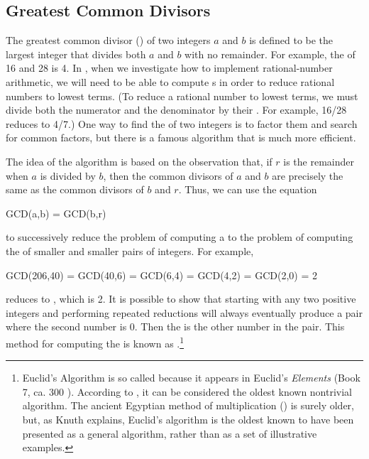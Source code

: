 \subsection{Greatest Common Divisors}
\label{Section 1.2.5}

The greatest common divisor () of two integers \( a \) and \( b \) is
defined to be the largest integer that divides both \( a \) and \( b \) with no
remainder.  For example, the  of 16 and 28 is 4.  In , when we investigate how to implement rational-number arithmetic, we will
need to be able to compute s in order to reduce rational numbers
to lowest terms.  (To reduce a rational number to lowest terms, we must divide
both the numerator and the denominator by their .  For example,
16/28 reduces to 4/7.)  One way to find the  of two integers is to
factor them and search for common factors, but there is a famous algorithm that
is much more efficient.

The idea of the algorithm is based on the observation that, if \( r \) is the
remainder when \( a \) is divided by \( b \), then the common divisors of \( a \) and
\( b \) are precisely the same as the common divisors of \( b \) and \( r \).  Thus,
we can use the equation

\begin{example}
GCD(a,b) = GCD(b,r)
\end{example}

\noindent
to successively reduce the problem of computing a  to the problem
of computing the  of smaller and smaller pairs of integers.  For
example,

\begin{example}
GCD(206,40) = GCD(40,6)
            = GCD(6,4)
            = GCD(4,2)
            = GCD(2,0)
            = 2
\end{example}

\noindent
reduces  to , which is 2.  It is
possible to show that starting with any two positive integers and performing
repeated reductions will always eventually produce a pair where the second
number is 0.  Then the  is the other number in the pair.  This
method for computing the  is known as .\footnote{Euclid's Algorithm is so called because it appears in
Euclid's \textit{Elements} (Book 7, ca. 300 ).  According to ,
it can be considered the oldest known nontrivial algorithm.  The
ancient Egyptian method of multiplication () is surely
older, but, as Knuth explains, Euclid's algorithm is the oldest known to have
been presented as a general algorithm, rather than as a set of illustrative
examples.}

